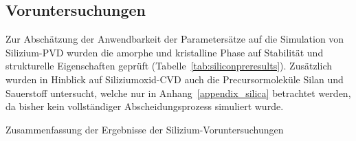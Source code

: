 \subsection{Voruntersuchungen}

Zur Abschätzung der Anwendbarkeit der Parametersätze auf die Simulation von Silizium-PVD wurden die amorphe und kristalline Phase auf Stabilität und strukturelle Eigenschaften geprüft (Tabelle~\ref{tab:siliconpreresults}).
Zusätzlich wurden in Hinblick auf Siliziumoxid-CVD auch die Precursormoleküle Silan und Sauerstoff untersucht, welche nur in Anhang~\ref{appendix_silica} betrachtet werden, da bisher kein vollständiger Abscheidungsprozess simuliert wurde.

\begin{table}[th]
  \begin{threeparttable}
    \caption{Zusammenfassung der Ergebnisse der Silizium-Voruntersuchungen}
    \label{tab:siliconpreresults}


\end{threeparttable}
\end{table}
